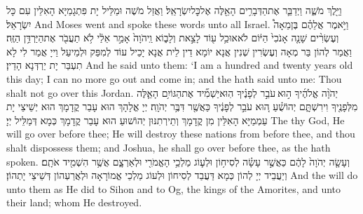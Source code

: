 \newperek
{}
{וַיֵּ֖לֶךְ מֹשֶׁ֑ה וַיְדַבֵּ֛ר אֶת\maqqaf הַדְּבָרִ֥ים הָאֵ֖לֶּה אֶל\maqqaf כׇּל\maqqaf יִשְׂרָאֵֽל׃}
{וַאֲזַל מֹשֶׁה וּמַלֵּיל יָת פִּתְגָמַיָּא הָאִלֵּין עִם כָּל יִשְׂרָאֵל׃}
{And Moses went and spoke these words unto all Israel.}{}
{וַיֹּ֣אמֶר אֲלֵהֶ֗ם בֶּן\maqqaf מֵאָה֩ וְעֶשְׂרִ֨ים שָׁנָ֤ה אָנֹכִי֙ הַיּ֔וֹם לֹא\maqqaf אוּכַ֥ל ע֖וֹד לָצֵ֣את וְלָב֑וֹא וַֽיהֹוָה֙ אָמַ֣ר אֵלַ֔י לֹ֥א תַעֲבֹ֖ר אֶת\maqqaf הַיַּרְדֵּ֥ן הַזֶּֽה׃}
{וַאֲמַר לְהוֹן בַּר מְאָה וְעֶשְׂרִין שְׁנִין אֲנָא יוֹמָא דֵין לֵית אֲנָא יָכֵיל עוֹד לְמִפַּק וּלְמֵיעַל וַייָ אֲמַר לִי לָא תִעְבַּר יָת יַרְדְּנָא הָדֵין׃}
{And he said unto them: ‘I am a hundred and twenty years old this day; I can no more go out and come in; and the \lord\space hath said unto me: Thou shalt not go over this Jordan.}{}
{יְהֹוָ֨ה אֱלֹהֶ֜יךָ ה֣וּא \legarmeh  עֹבֵ֣ר לְפָנֶ֗יךָ הֽוּא\maqqaf יַשְׁמִ֞יד אֶת\maqqaf הַגּוֹיִ֥ם הָאֵ֛לֶּה מִלְּפָנֶ֖יךָ וִירִשְׁתָּ֑ם יְהוֹשֻׁ֗עַ ה֚וּא עֹבֵ֣ר לְפָנֶ֔יךָ כַּאֲשֶׁ֖ר דִּבֶּ֥ר יְהֹוָֽה׃}
{יְיָ אֱלָהָךְ הוּא עָבַר קֳדָמָךְ הוּא יְשֵׁיצֵי יָת עַמְמַיָּא הָאִלֵּין מִן קֳדָמָךְ וְתֵירְתִנּוּן יְהוֹשׁוּעַ הוּא עָבַר קֳדָמָךְ כְּמָא דְּמַלֵּיל יְיָ׃}
{The \lord\space thy God, He will go over before thee; He will destroy these nations from before thee, and thou shalt dispossess them; and Joshua, he shall go over before thee, as the \lord\space hath spoken.}{}
{וְעָשָׂ֤ה יְהֹוָה֙ לָהֶ֔ם כַּאֲשֶׁ֣ר עָשָׂ֗ה לְסִיח֥וֹן וּלְע֛וֹג מַלְכֵ֥י הָאֱמֹרִ֖י וּלְאַרְצָ֑ם אֲשֶׁ֥ר הִשְׁמִ֖יד אֹתָֽם׃}
{וְיַעֲבֵיד יְיָ לְהוֹן כְּמָא דַּעֲבַד לְסִיחוֹן וּלְעוֹג מַלְכֵי אֱמוֹרָאָה וּלְאֲרַעְהוֹן דְּשֵׁיצֵי יָתְהוֹן׃}
{And the \lord\space will do unto them as He did to Sihon and to Og, the kings of the Amorites, and unto their land; whom He destroyed.}{}
